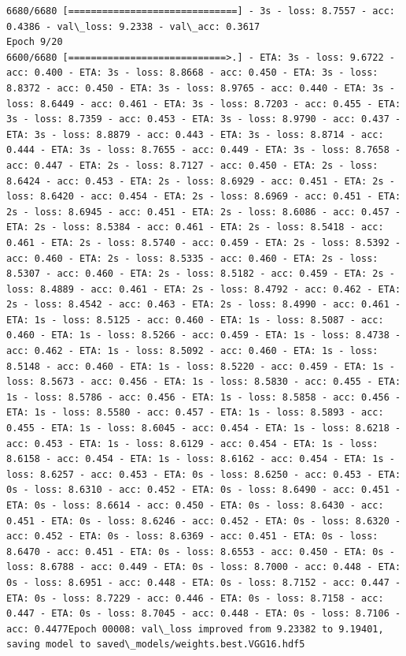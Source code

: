 \documentclass[11pt]{article}
\begin{document}
\begin{Verbatim}[commandchars=\\\{\}]
6680/6680 [==============================] - 3s - loss: 8.7557 - acc: 0.4386 - val\_loss: 9.2338 - val\_acc: 0.3617
Epoch 9/20
6600/6680 [============================>.] - ETA: 3s - loss: 9.6722 - acc: 0.400 - ETA: 3s - loss: 8.8668 - acc: 0.450 - ETA: 3s - loss: 8.8372 - acc: 0.450 - ETA: 3s - loss: 8.9765 - acc: 0.440 - ETA: 3s - loss: 8.6449 - acc: 0.461 - ETA: 3s - loss: 8.7203 - acc: 0.455 - ETA: 3s - loss: 8.7359 - acc: 0.453 - ETA: 3s - loss: 8.9790 - acc: 0.437 - ETA: 3s - loss: 8.8879 - acc: 0.443 - ETA: 3s - loss: 8.8714 - acc: 0.444 - ETA: 3s - loss: 8.7655 - acc: 0.449 - ETA: 3s - loss: 8.7658 - acc: 0.447 - ETA: 2s - loss: 8.7127 - acc: 0.450 - ETA: 2s - loss: 8.6424 - acc: 0.453 - ETA: 2s - loss: 8.6929 - acc: 0.451 - ETA: 2s - loss: 8.6420 - acc: 0.454 - ETA: 2s - loss: 8.6969 - acc: 0.451 - ETA: 2s - loss: 8.6945 - acc: 0.451 - ETA: 2s - loss: 8.6086 - acc: 0.457 - ETA: 2s - loss: 8.5384 - acc: 0.461 - ETA: 2s - loss: 8.5418 - acc: 0.461 - ETA: 2s - loss: 8.5740 - acc: 0.459 - ETA: 2s - loss: 8.5392 - acc: 0.460 - ETA: 2s - loss: 8.5335 - acc: 0.460 - ETA: 2s - loss: 8.5307 - acc: 0.460 - ETA: 2s - loss: 8.5182 - acc: 0.459 - ETA: 2s - loss: 8.4889 - acc: 0.461 - ETA: 2s - loss: 8.4792 - acc: 0.462 - ETA: 2s - loss: 8.4542 - acc: 0.463 - ETA: 2s - loss: 8.4990 - acc: 0.461 - ETA: 1s - loss: 8.5125 - acc: 0.460 - ETA: 1s - loss: 8.5087 - acc: 0.460 - ETA: 1s - loss: 8.5266 - acc: 0.459 - ETA: 1s - loss: 8.4738 - acc: 0.462 - ETA: 1s - loss: 8.5092 - acc: 0.460 - ETA: 1s - loss: 8.5148 - acc: 0.460 - ETA: 1s - loss: 8.5220 - acc: 0.459 - ETA: 1s - loss: 8.5673 - acc: 0.456 - ETA: 1s - loss: 8.5830 - acc: 0.455 - ETA: 1s - loss: 8.5786 - acc: 0.456 - ETA: 1s - loss: 8.5858 - acc: 0.456 - ETA: 1s - loss: 8.5580 - acc: 0.457 - ETA: 1s - loss: 8.5893 - acc: 0.455 - ETA: 1s - loss: 8.6045 - acc: 0.454 - ETA: 1s - loss: 8.6218 - acc: 0.453 - ETA: 1s - loss: 8.6129 - acc: 0.454 - ETA: 1s - loss: 8.6158 - acc: 0.454 - ETA: 1s - loss: 8.6162 - acc: 0.454 - ETA: 1s - loss: 8.6257 - acc: 0.453 - ETA: 0s - loss: 8.6250 - acc: 0.453 - ETA: 0s - loss: 8.6310 - acc: 0.452 - ETA: 0s - loss: 8.6490 - acc: 0.451 - ETA: 0s - loss: 8.6614 - acc: 0.450 - ETA: 0s - loss: 8.6430 - acc: 0.451 - ETA: 0s - loss: 8.6246 - acc: 0.452 - ETA: 0s - loss: 8.6320 - acc: 0.452 - ETA: 0s - loss: 8.6369 - acc: 0.451 - ETA: 0s - loss: 8.6470 - acc: 0.451 - ETA: 0s - loss: 8.6553 - acc: 0.450 - ETA: 0s - loss: 8.6788 - acc: 0.449 - ETA: 0s - loss: 8.7000 - acc: 0.448 - ETA: 0s - loss: 8.6951 - acc: 0.448 - ETA: 0s - loss: 8.7152 - acc: 0.447 - ETA: 0s - loss: 8.7229 - acc: 0.446 - ETA: 0s - loss: 8.7158 - acc: 0.447 - ETA: 0s - loss: 8.7045 - acc: 0.448 - ETA: 0s - loss: 8.7106 - acc: 0.4477Epoch 00008: val\_loss improved from 9.23382 to 9.19401, saving model to saved\_models/weights.best.VGG16.hdf5

\end{Verbatim}
\end{document}
